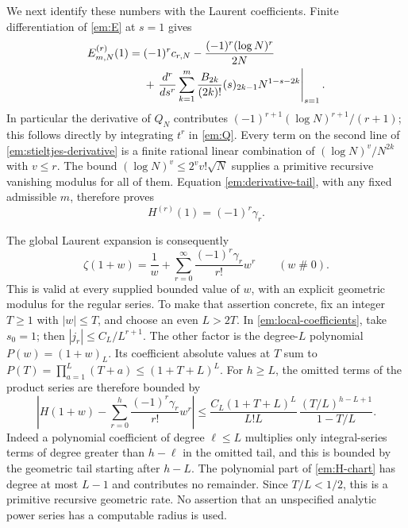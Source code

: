 We next identify these numbers with the Laurent coefficients.  Finite
differentiation of \eqref{em:E} at $s=1$ gives
\begin{align}
 E_{m,N}^{(r)}(1)={}&(-1)^r c_{r,N}
       -\frac{(-1)^r(\log N)^r}{2N}\notag\\
 &+\left.\frac{d^r}{ds^r}
      \sum_{k=1}^m\frac{B_{2k}}{(2k)!}
                     (s)_{2k-1}N^{1-s-2k}\right|_{s=1}.
 \label{em:stieltjes-derivative}
\end{align}
In particular the derivative of $Q_N$ contributes
$(-1)^{r+1}(\log N)^{r+1}/(r+1)$; this follows directly by integrating
$t^r$ in \eqref{em:Q}.  Every term on the second line of
\eqref{em:stieltjes-derivative} is a finite rational linear combination
of $(\log N)^v/N^{2k}$ with $v\leq r$.  The bound
$(\log N)^v\leq2^v v!\sqrt N$ supplies a primitive recursive vanishing
modulus for all of them.  Equation \eqref{em:derivative-tail}, with any
fixed admissible $m$, therefore proves
\begin{equation}
 H^{(r)}(1)=(-1)^r\gamma_r.
 \label{em:stieltjes-identification}
\end{equation}

The global Laurent expansion is consequently
\begin{equation}
 \zeta(1+w)=\frac1w+
        \sum_{r=0}^\infty\frac{(-1)^r\gamma_r}{r!}w^r
        \qquad(w\mathrel{\#}0).
 \label{em:global-laurent}
\end{equation}
This is valid at every supplied bounded value of $w$, with an explicit
geometric modulus for the regular series.  To make that assertion
concrete, fix an integer $T\geq1$ with $|w|\leq T$, and choose an even
$L>2T$.  In \eqref{em:local-coefficients}, take $s_0=1$; then
$|j_r|\leq C_L/L^{r+1}$.  The other factor is the degree-$L$ polynomial
$P(w)=(1+w)_L$.  Its coefficient absolute values at $T$ sum to
$P(T)=\prod_{a=1}^L(T+a)\leq(1+T+L)^L$.
For $h\geq L$, the omitted terms of the product series are therefore
bounded by
\begin{equation}
 \left|H(1+w)-\sum_{r=0}^h
           \frac{(-1)^r\gamma_r}{r!}w^r\right|
 \leq
 \frac{C_L(1+T+L)^L}{L!L}\,
       \frac{(T/L)^{h-L+1}}{1-T/L}.
 \label{em:global-laurent-tail}
\end{equation}
Indeed a polynomial coefficient of degree $\ell\leq L$ multiplies only
integral-series terms of degree greater than $h-\ell$ in the omitted
tail, and this is bounded by the geometric tail starting after $h-L$.
The polynomial part of \eqref{em:H-chart} has degree at most $L-1$ and
contributes no remainder.  Since $T/L<1/2$, this is a primitive recursive
geometric rate.  No assertion that an unspecified analytic power series
has a computable radius is used.

